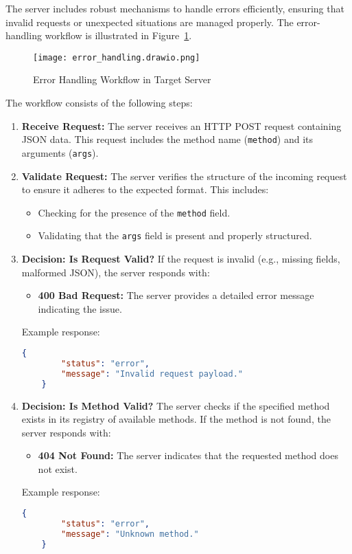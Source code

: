 \documentclass{article}
\begin{document}
The server includes robust mechanisms to handle errors efficiently, ensuring that invalid requests or unexpected situations are managed properly. The error-handling workflow is illustrated in Figure~\ref{fig:error_handling_workflow}.

\begin{figure}[H]
    \centering
    \texttt{[image: error\_handling.drawio.png]}
    \caption{Error Handling Workflow in Target Server}
    \label{fig:error_handling_workflow}
\end{figure}

The workflow consists of the following steps:

\begin{enumerate}
    \item \textbf{Receive Request:}  
    The server receives an HTTP POST request containing JSON data. This request includes the method name (\texttt{method}) and its arguments (\texttt{args}).

    \item \textbf{Validate Request:}  
    The server verifies the structure of the incoming request to ensure it adheres to the expected format. This includes:
    \begin{itemize}
        \item Checking for the presence of the \texttt{method} field.
        \item Validating that the \texttt{args} field is present and properly structured.
    \end{itemize}

    \item \textbf{Decision: Is Request Valid?}  
    If the request is invalid (e.g., missing fields, malformed JSON), the server responds with:
    \begin{itemize}
        \item \textbf{400 Bad Request:} The server provides a detailed error message indicating the issue.
    \end{itemize}
    Example response:
    \begin{lstlisting}[language=JSON]
    {
        "status": "error",
        "message": "Invalid request payload."
    }
    \end{lstlisting}

    \item \textbf{Decision: Is Method Valid?}  
    The server checks if the specified method exists in its registry of available methods.
    If the method is not found, the server responds with:
    \begin{itemize}
        \item \textbf{404 Not Found:} The server indicates that the requested method does not exist.
    \end{itemize}
    Example response:
    \begin{lstlisting}[language=JSON]
    {
        "status": "error",
        "message": "Unknown method."
    }
    \end{lstlisting}


\end{enumerate}
\end{document}
